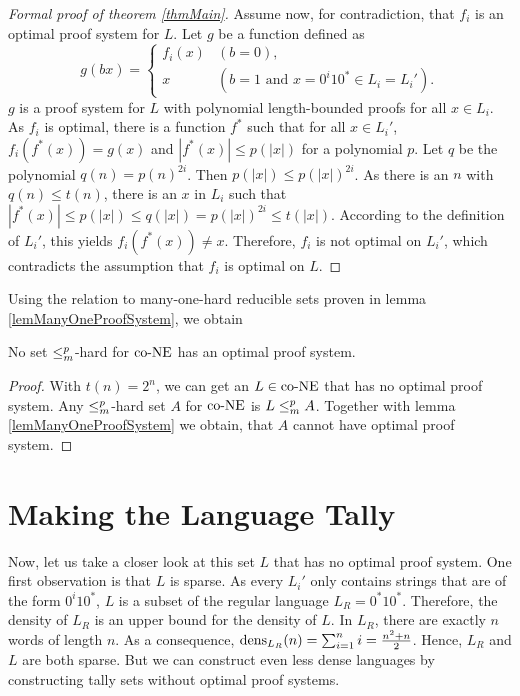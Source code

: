 \begin{proof}[Formal proof of theorem \ref{thmMain}]
    Assume now, for contradiction, that \(f_i\) is an optimal proof system for \(L\). Let \(g\) be a function defined as
      \[ g(bx) = \begin{cases}
                  f_i(x) & (b = 0), \\
                  x & (b = 1 \text{ and } x = 0^i10^* \in L_i = L_i').
                 \end{cases} \]
    \(g\) is a proof system for \(L\) with polynomial length-bounded proofs for all \(x \in L_i\). As \(f_i\) is optimal, there is a function \(f^*\) such that for all \(x \in L_i'\), \(f_i(f^*(x)) = g(x)\) and \(|f^*(x)| \leq p(|x|)\) for a polynomial \(p\). Let \(q\) be the polynomial \(q(n) = p(n)^{2i}\). Then \(p(|x|) \leq p(|x|)^{2i}\). As there is an \(n\) with \(q(n) \leq t(n)\), there is an \(x\) in \(L_i\) such that \(|f^*(x)| \leq p(|x|) \leq q(|x|) = p(|x|)^{2i} \leq t(|x|)\). According to the definition of \(L_i'\), this yields \(f_i(f^*(x)) \neq x\). Therefore, \(f_i\) is not optimal on \(L_i'\), which contradicts the assumption that \(f_i\) is optimal on \(L\).
  \end{proof}

  Using the relation to many-one-hard reducible sets proven in lemma \ref{lemManyOneProofSystem}, we obtain

  \begin{corollary} \label{corHardSets}
    No set \(\leq_{m}^{p}\)-hard for \(\text{co-NE}\) has an optimal proof system.
  \end{corollary}

  \begin{proof}
    With \(t(n) = 2^n\), we can get an \(L \in \text{co-NE}\) that has no optimal proof system. Any \(\leq_{m}^{p}\)-hard set \(A\) for \(\text{co-NE}\) is \(L \leq_{m}^{p} A\). Together with lemma \ref{lemManyOneProofSystem} we obtain, that \(A\) cannot have optimal proof system.
  \end{proof}

  \section{Making the Language Tally}

  Now, let us take a closer look at this set \(L\) that has no optimal proof system. One first observation is that \(L\) is sparse. As every \(L_i'\) only contains strings that are of the form \(0^i10^*\), \(L\) is a subset of the regular language \(L_R = 0^*10^*\). Therefore, the density of \(L_R\) is an upper bound for the density of \(L\). In \(L_R\), there are exactly \(n\) words of length \(n\). As a consequence, \(\operatorname{dens}_{L_R}(n) = \sum_{i=1}^n i = \frac{n^2 + n}{2}\). Hence, \(L_R\) and \(L\) are both sparse. But we can construct even less dense languages by constructing tally sets without optimal proof systems.


